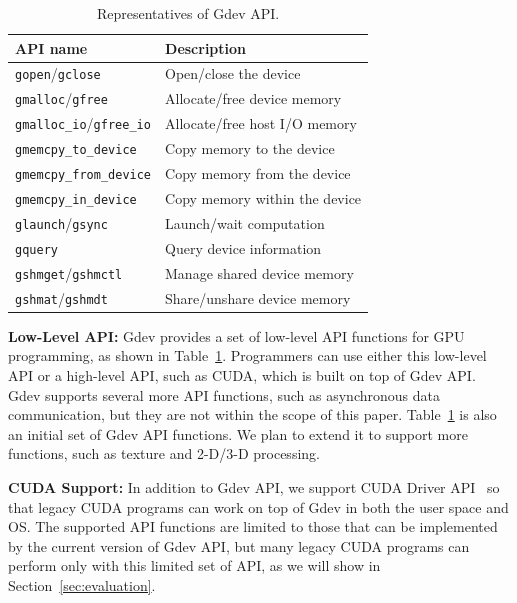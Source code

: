\begin{table}[t]
 \caption{Representatives of Gdev API.}
 \vspace{-1em}
 \label{tab:gdev_api}
 \begin{center}
  {\small
  \begin{tabular}{|l|l|}
   \hline
   \textbf{API name} & \textbf{Description}\\
   \hline
   \texttt{gopen}/\texttt{gclose} & Open/close the device\\
   \hline
   \texttt{gmalloc}/\texttt{gfree} & Allocate/free device memory\\
   \hline
   \texttt{gmalloc\_io}/\texttt{gfree\_io} & Allocate/free host I/O memory\\
   \hline
   \texttt{gmemcpy\_to\_device} & Copy memory to the device\\
   \hline
   \texttt{gmemcpy\_from\_device} & Copy memory from the device\\
   \hline
   \texttt{gmemcpy\_in\_device} & Copy memory within the device\\
   \hline
   \texttt{glaunch}/\texttt{gsync} & Launch/wait computation\\
   \hline
   \texttt{gquery} & Query device information\\
   \hline
   \texttt{gshmget}/\texttt{gshmctl} & Manage shared device memory\\
   \hline
   \texttt{gshmat}/\texttt{gshmdt} & Share/unshare device memory\\
   \hline
  \end{tabular}
  }
 \end{center}
\vspace{-1em}
\end{table}

\textbf{Low-Level API:}
Gdev provides a set of low-level API functions for GPU programming, as
shown in Table~\ref{tab:gdev_api}.
Programmers can use either this low-level API or a high-level API, such
as CUDA, which is built on top of Gdev API.
Gdev supports several more API functions, such as asynchronous data
communication, but they are not within the scope of this paper.
Table~\ref{tab:gdev_api} is also an initial set of Gdev API functions.
We plan to extend it to support more functions, such as texture and
2-D/3-D processing.

\textbf{CUDA Support:}
In addition to Gdev API, we support CUDA Driver API~\cite{CUDA40} so
that legacy CUDA programs can work on top of Gdev in both the user
space and OS.
The supported API functions are limited to those that can be implemented 
by the current version of Gdev API, but many legacy CUDA programs can
perform only with this limited set of API, as we will show in
Section~\ref{sec:evaluation}.


